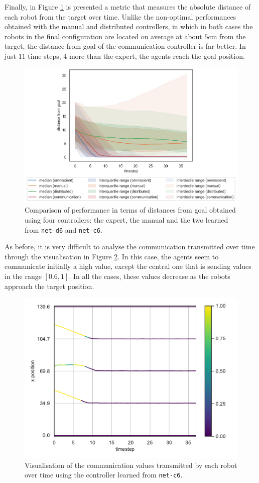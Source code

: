 \bigskip
Finally, in Figure \ref{fig:net-c6distance} is presented a metric that measures the 
absolute distance of each robot from the target over time.
Unlike the non-optimal performances obtained with the manual and distributed 
controllers, in which in both cases the robots in the final configuration are 
located on average at about $5$\gls{cm} from the target, the distance from goal 
of the communication controller is far better. In just $11$ time steps, $4$ more 
than the expert, the agents reach the goal position.
\begin{figure}[H]
	\centering
	\includegraphics[width=.65\textwidth]{contents/images/net-c6/distances-from-goal-compressed-communication}%
	\caption[Evaluation of \texttt{net-c6} distances from goal.]{Comparison of 
		performance in terms of distances from goal obtained using four controllers: 
		the expert, the manual and the two learned from \texttt{net-d6} and 
		\texttt{net-c6}.}
	\label{fig:net-c6distance}
\end{figure}

As before, it is very difficult to analyse the communication transmitted over time 
through the visualisation in Figure \ref{fig:net-c6comm}. In this case, the agents 
seem to communicate initially a high value, except the central one that is sending 
values in the range $[0.6, 1]$. In all the cases, these values decrease as the robots 
approach the target position.
\begin{figure}[!htb]
	\centering
	\includegraphics[width=.6\textwidth]{contents/images/net-c6/4/plot-simulation-communication-4}
	\vspace{-0.5cm}
	\caption[Evaluation of the communication learned by 
	\texttt{net-c6}.]{Visualisation of the communication values transmitted by each 
		robot over time using the controller learned from \texttt{net-c6}.}	
	\label{fig:net-c6comm}
\end{figure}

